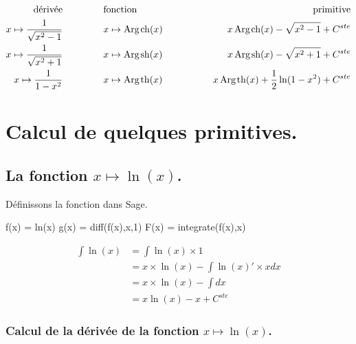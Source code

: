 \documentclass[a4paper,12pt]{report}
\renewcommand{\sinh}{\mathop{\mathrm{sh}}}
\renewcommand{\cosh}{\mathop{\mathrm{ch}}}
\renewcommand{\tanh}{\mathop{\mathrm{th}}}
\renewcommand{\arg}{\mathop{\mathrm{Arg}}}
\begin{document}
\begin{align*}
\textrm{dérivée} \hspace{1.5cm} & \textrm{fonction} \hspace{1.5cm} & \textrm{primitive}  \\ 
x \mapsto \frac{1}{ \sqrt{x^2-1}} \hspace{1.5cm} & x \mapsto \arg\mspace{-1mu}\cosh(x) \hspace{1.5cm} & x \arg\mspace{-1mu}\cosh(x) - \sqrt{x^2-1} + C^{ste}  \\
x \mapsto \frac{1}{ \sqrt{x^2+1}} \hspace{1.5cm} & x \mapsto \arg\mspace{-1mu}\sinh(x) \hspace{1.5cm} & x \arg\mspace{-1mu}\sinh(x) - \sqrt{x^2 +1 } + C^{ste}   \\
x \mapsto \frac{1}{ 1 - x^2} \hspace{1.5cm} & x \mapsto \arg\mspace{-1mu}\tanh(x) \hspace{1.5cm} &  x \arg\mspace{-1mu}\tanh(x) + \frac{1}{2} \ln(1- x^2) + C^{ste} \\
\end{align*}




\chapter{Calcul de quelques primitives.}

\section{La fonction  $x \mapsto \ln(x) $.}
Définissons la fonction dans Sage.
\begin{sageblock}
    f(x) = ln(x)
    g(x) = diff(f(x),x,1)
    F(x) = integrate(f(x),x)
\end{sageblock}
\begin{align*}
\int \ln(x) & =  \int \ln(x) \times 1 \\ 
& =  x \times \ln(x) - \int \ln(x)' \times x dx \\ 
& =  x \times \ln(x) - \int  dx \\ 
& =   x  \ln(x) - x + C^{ste}
\end{align*}

\subsection{Calcul de la dérivée de la fonction $x \mapsto \ln(x) $.}
\end{document}
